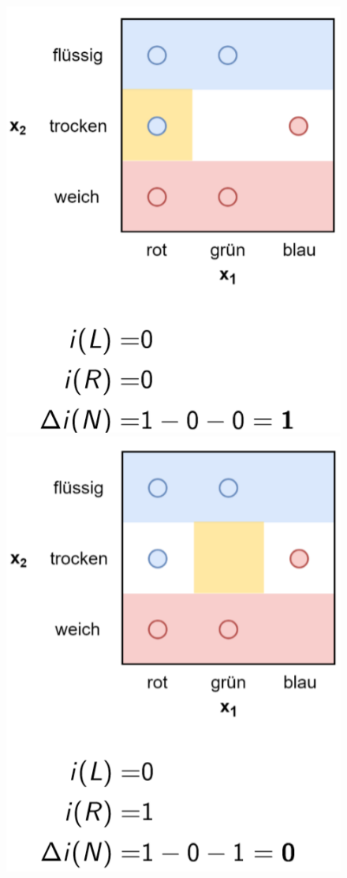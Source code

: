 \documentclass{report}
\begin{document}
\begin{figure}[H]
  \centering
  \begin{minipage}[b]{0.4\textwidth}
    \includegraphics[scale=.235]{ml07_21}
  \end{minipage}
  \begin{minipage}[b]{0.4\textwidth}
    \includegraphics[scale=.235]{ml07_22}

\end{minipage}
\end{figure}
\end{document}
